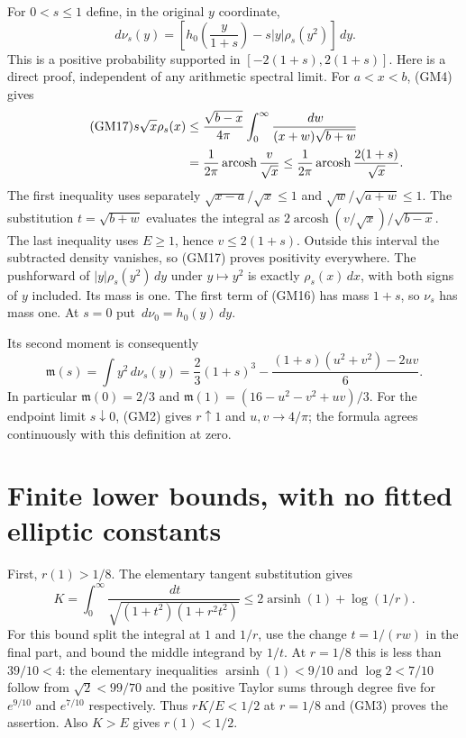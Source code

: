 \documentclass[11pt]{article}
\newcommand{\dd}{\,d}\newcommand{\R}{\mathbb R}
\begin{document}
For $0<s\le1$ define, in the original $y$ coordinate,
\begin{equation}\tag{GM16}
 \dd\nu_s(y)=\left[h_0\left(\frac y{1+s}\right)
                    -s|y|\rho_s(y^2)\right]\dd y.
\end{equation}
This is a positive probability supported in $[-2(1+s),2(1+s)]$.
Here is a direct proof, independent of any arithmetic spectral limit.
For $a<x<b$, (GM4) gives
\begin{align}\tag{GM17}
 s\sqrt x\rho_s(x)
 &\le\frac{\sqrt{b-x}}{4\pi}
          \int_0^\infty\frac{\dd w}{(x+w)\sqrt{b+w}}\notag\\
 &=\frac1{2\pi}\operatorname{arcosh}\frac v{\sqrt x}
 \le\frac1{2\pi}\operatorname{arcosh}\frac{2(1+s)}{\sqrt x}.\notag
\end{align}
The first inequality uses separately $\sqrt{x-a}/\sqrt x\le1$ and
$\sqrt w/\sqrt{a+w}\le1$. The substitution $t=\sqrt{b+w}$ evaluates
the integral as
$2\operatorname{arcosh}(v/\sqrt x)/\sqrt{b-x}$.
The last inequality uses $E\ge1$, hence $v\le2(1+s)$.
Outside this interval the subtracted density vanishes, so (GM17)
proves positivity everywhere. The pushforward of
$|y|\rho_s(y^2)\dd y$ under $y\mapsto y^2$ is exactly
$\rho_s(x)\dd x$, with both signs of $y$ included. Its mass is one.
The first term of (GM16) has mass $1+s$, so $\nu_s$ has mass one.
At $s=0$ put $\dd\nu_0=h_0(y)\dd y$.

Its second moment is consequently
\begin{equation}\tag{GM18}
 \boxed{\mathfrak m(s)=\int y^2\dd\nu_s(y)
 =\frac23(1+s)^3-\frac{(1+s)(u^2+v^2)-2uv}{6}.}
\end{equation}
In particular $\mathfrak m(0)=2/3$ and
$\mathfrak m(1)=(16-u^2-v^2+uv)/3$.
For the endpoint limit $s\downarrow0$, (GM2) gives
$r\uparrow1$ and $u,v\to4/\pi$; the formula agrees continuously
with this definition at zero.

\section{Finite lower bounds, with no fitted elliptic constants}
First, $r(1)>1/8$. The elementary tangent substitution gives
\[
 K=\int_0^\infty\frac{\dd t}{\sqrt{(1+t^2)(1+r^2t^2)}}
 \le2\operatorname{arsinh}(1)+\log(1/r).
\]
For this bound split the integral at $1$ and $1/r$, use the change
$t=1/(rw)$ in the final part, and bound the middle integrand by $1/t$.
At $r=1/8$ this is less than $39/10<4$: the elementary inequalities
$\operatorname{arsinh}(1)<9/10$ and $\log2<7/10$ follow from
$\sqrt2<99/70$ and the positive Taylor sums through degree five for
$e^{9/10}$ and $e^{7/10}$ respectively.
Thus $rK/E<1/2$ at $r=1/8$ and (GM3) proves the assertion.
Also $K>E$ gives $r(1)<1/2$.
\end{document}
